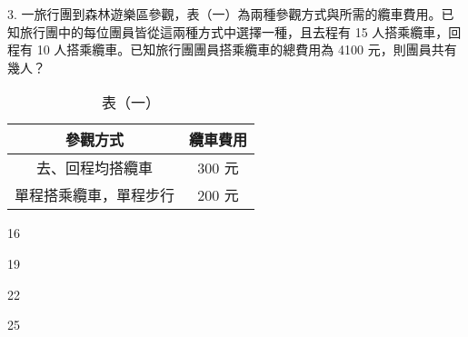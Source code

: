 \documentclass[12pt]{article}
\begin{document}
\begin{problem}
  \item[3.] 一旅行團到森林遊樂區參觀，表（一）為兩種參觀方式與所需的纜車費用。已知旅行團中的每位團員皆從這兩種方式中選擇一種，且去程有 15 人搭乘纜車，回程有 10 人搭乘纜車。已知旅行團團員搭乘纜車的總費用為 4100 元，則團員共有幾人？
  \begin{table}[ht]
    \centering\small
    \renewcommand{\arraystretch}{1.2}
    \vspace*{-1ex}
    \caption*{表（一）}
    \vspace*{-1ex}
    \begin{tabular}{|c|c|}
      \hline
      參觀方式 & 纜車費用 \\ \hline
      去、回程均搭纜車 & 300 元 \\ \hline
      單程搭乘纜車，單程步行 & 200 元 \\ \hline
    \end{tabular}
    \vspace*{-2ex}
  \end{table}
  \begin{choices}
    \item 16
    \item 19
    \item 22
    \item 25
  \end{choices}
\end{problem}
\end{document}
